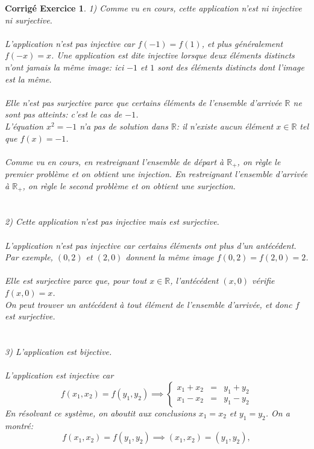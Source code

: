 \documentclass[11pt,french,table]{article}
\theoremstyle{exercice}
\theoremstyle{corrigé}
\newtheorem{corrigé}{Corrigé Exercice}
\begin{document}
\begin{corrigé}
1) Comme vu en cours, cette application n'est ni injective ni surjective. \\ \\
L'application n'est pas injective car $f(-1) = f(1)$, et plus généralement $f(-x) = x$. Une application est dite injective lorsque deux éléments distincts n'ont jamais la même image: ici $-1$ et $1$ sont des éléments distincts dont l'image est la même. \\ \\
Elle n'est pas surjective parce que certains éléments de l'ensemble d'arrivée $\mathbb{R}$ ne sont pas atteints: c'est le cas de $-1$. \\
L'équation $x^2=-1$ n'a pas de solution dans $\mathbb{R}$: il n'existe aucun élément $x \in \mathbb{R}$ tel que $f(x) = -1$. \\ \\
Comme vu en cours, en restreignant l'ensemble de départ à $\mathbb{R}_+$, on règle le premier problème et on obtient une injection. En restreignant l'ensemble d'arrivée à $\mathbb{R}_+$, on règle le second problème et on obtient une surjection. \\
\\
\\
2) Cette application n'est pas injective mais est surjective. \\
\\
L'application n'est pas injective car certains éléments ont plus d'un antécédent. Par exemple, $(0,2)$ et $(2,0)$ donnent la même image $f(0,2) = f(2,0) = 2$. \\
\\
Elle est surjective parce que, pour tout $x \in \mathbb{R}$, l'antécédent $(x,0)$ vérifie $f(x,0) = x$. \\
On peut trouver un antécédent à tout élément de l'ensemble d'arrivée, et donc $f$ est surjective. \\
\\
\\
3) L'application est bijective. \\
\\
L'application est injective car $$f(x_1,x_2) = f(y_1,y_2) \implies \left\{ \begin{array}{rcl}
x_1+x_2 &=& y_1+y_2 \\
x_1-x_2 &=& y_1-y_2
\end{array} \right.
$$
En résolvant ce système, on aboutit aux conclusions $x_1 = x_2$ et $y_1 = y_2$. On a montré:
$$f(x_1,x_2) = f(y_1,y_2) \implies (x_1,x_2)=(y_1,y_2),$$

\end{corrigé}
\end{document}
